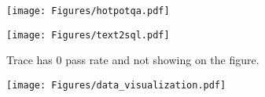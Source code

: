 {
\begin{figure*}[th]
\begin{minipage}{0.67\columnwidth}
\begin{center}
\centerline{\texttt{[image: Figures/hotpotqa.pdf]}}
{
}
\end{center}
\end{minipage}
\hfill
\begin{minipage}{0.67\columnwidth}
\begin{center}
\centerline{\texttt{[image: Figures/text2sql.pdf]}}
{
Trace has 0 pass rate and not showing on the figure.
}
\end{center}
\end{minipage}
\hfill
\begin{minipage}{0.67\columnwidth}
\begin{center}
\centerline{\texttt{[image: Figures/data\_visualization.pdf]}}
{
}
\end{center}
\end{minipage}
\end{figure*}
}
